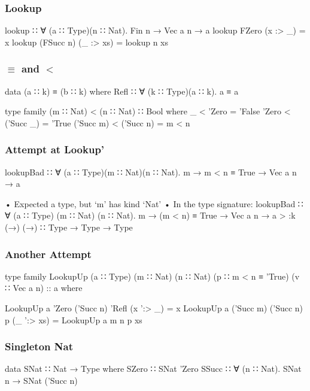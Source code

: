 \documentclass{beamer}
\begin{document}
\begin{frame}[fragile]\frametitle{Lookup}
\begin{semiverbatim}
lookup ∷ ∀ (a ∷ Type)(n ∷ Nat). Fin n → Vec a n → a
lookup FZero     (x :> _)  = x
lookup (FSucc n) (_ :> xs) = lookup n xs
\end{semiverbatim}
\end{frame}

\begin{frame}[fragile]\frametitle{$\equiv$ and $<$}
\begin{semiverbatim}
data (a ∷ k) ≡ (b ∷ k) where
  Refl ∷ ∀ (k ∷ Type)(a ∷ k). a ≡ a

type family (m ∷ Nat) < (n ∷ Nat) ∷ Bool where
  _         < 'Zero     = 'False
  'Zero     < ('Succ _) = 'True
  ('Succ m) < ('Succ n) = m < n
\end{semiverbatim}
\end{frame}

\begin{frame}[fragile]\frametitle{Attempt at Lookup'}
\begin{semiverbatim}
lookupBad ∷ ∀ (a ∷ Type)(m ∷ Nat)(n ∷ Nat).
            m → m < n ≡ True → Vec a n → a

  • Expected a type, but ‘m’ has kind ‘Nat’
  • In the type signature:
      lookupBad ∷ ∀ (a ∷ Type) (m ∷ Nat) (n ∷ Nat).
                   m → (m < n) ≡ True → Vec a n → a
> :k (→)
(→) ∷ Type → Type → Type
\end{semiverbatim}
\end{frame}

\begin{frame}[fragile]\frametitle{Another Attempt}
\begin{semiverbatim}
  type family LookupUp (a ∷ Type) (m ∷ Nat) (n ∷ Nat)
                       (p ∷ m < n ≡ 'True) 
                       (v ∷ Vec a n) :: a where

  LookupUp a 'Zero     ('Succ n) 'Refl (x ':> _)  = x
  LookupUp a ('Succ m) ('Succ n) p     (_ ':> xs) =
    LookupUp a m n p xs
\end{semiverbatim}
\end{frame}

\begin{frame}[fragile]\frametitle{Singleton Nat}
\begin{semiverbatim}
data SNat ∷ Nat → Type where
  SZero ∷ SNat 'Zero
  SSucc ∷ ∀ (n ∷ Nat). SNat n → SNat ('Succ n)
\end{semiverbatim}
\end{frame}
\end{document}
